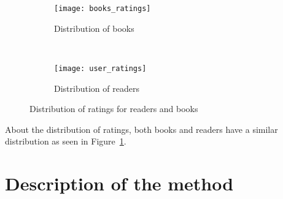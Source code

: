 \documentclass[11pt]{article}
\begin{document}



\begin{figure}
        \centering
        \begin{subfigure}[b]{0.5\textwidth}
                \texttt{[image: books\_ratings]}
                \caption{Distribution of books}
        \end{subfigure}%
        ~ %
        \begin{subfigure}[b]{0.5\textwidth}
                \texttt{[image: user\_ratings]}
                \caption{Distribution of readers}
        \end{subfigure}

        \caption{Distribution of ratings for readers and books}
        \label{fig:scatters}
\end{figure}

About the distribution of ratings, both books and readers have a similar distribution as seen in Figure~\ref{fig:scatters}.


\section{Description of the method}
\label{sec:method}
\end{document}
